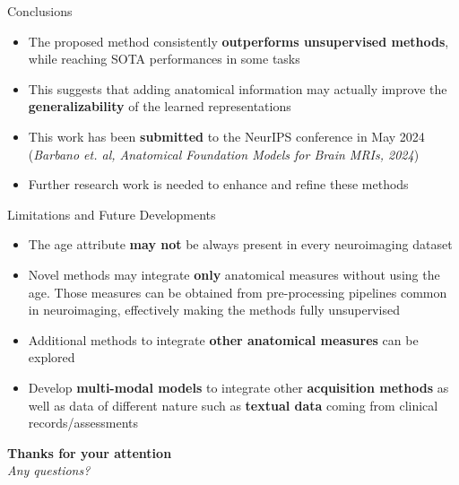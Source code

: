 \documentclass[12pt,aspectratio=169]{beamer}
\begin{document}
\begin{frame}{Conclusions}
\begin{itemize}
    \item The proposed method consistently \textbf{outperforms unsupervised
    methods}, while reaching SOTA performances in some tasks
    \item This suggests that adding anatomical information may actually improve
    the \textbf{generalizability} of the learned representations
    \item This work has been \textbf{submitted} to the NeurIPS conference in May 2024 (\emph{Barbano et. al, Anatomical Foundation Models for Brain MRIs,
    2024})
    \item Further research work is needed to enhance and refine these methods  
\end{itemize}
\end{frame}

\begin{frame}{Limitations and Future Developments}
\begin{itemize}
    \item The age attribute \textbf{may not} be always present in every
    neuroimaging dataset
    \item Novel methods may integrate \textbf{only} anatomical measures without
    using the age. Those measures can be obtained from pre-processing pipelines
    common in neuroimaging, effectively making the methods fully unsupervised
    \item Additional methods to integrate \textbf{other anatomical measures} can
    be explored
    \item Develop \textbf{multi-modal models} to integrate other
    \textbf{acquisition methods} as well as data of different nature such as
    \textbf{textual data} coming from clinical records/assessments  
\end{itemize}
\end{frame}

\begin{frame}
\centering
\Huge{\textbf{Thanks for your attention}}\\
\vspace{15pt}
\Large{\emph{Any questions?}}
\end{frame}
\end{document}
